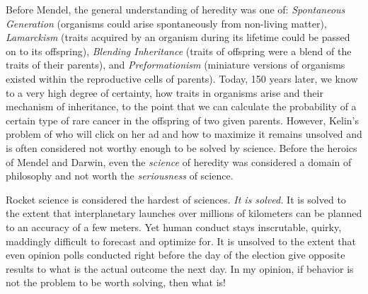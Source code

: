 \documentclass[PhD]{iiitd}
\begin{document}
Before Mendel, the general understanding of heredity was one of: \textit{Spontaneous Generation} (organisms could arise spontaneously from non-living matter), \textit{Lamarckism} (traits acquired by an organism during its lifetime could be passed on to its offspring), \textit{Blending Inheritance} (traits of offspring were a blend of the traits of their parents), and \textit{Preformationism} (miniature versions of organisms existed within the reproductive cells of parents). Today, 150 years later, we know to a very high degree of certainty, how traits in organisms arise and their mechanism of inheritance, to the point that we can calculate the probability of a certain type of rare cancer in the offspring of two given parents. However, Kelin's problem of who will click on her ad and how to maximize it remains unsolved and is often considered not worthy enough to be solved by science. Before the heroics of Mendel and Darwin, even the \textit{science} of heredity was considered a domain of philosophy and not worth the \textit{seriousness} of science. 


Rocket science is considered the hardest of sciences. \textit{It is solved.} It is solved to the extent that interplanetary launches over millions of kilometers can be planned to an accuracy of a few meters. Yet human conduct stays inscrutable, quirky, maddingly difficult to forecast and optimize for. It is unsolved to the extent that even opinion polls conducted right before the day of the election give opposite results to what is the actual outcome the next day. In my opinion, if behavior is not the problem to be worth solving, then what is!





\clearpage





\end{document}
